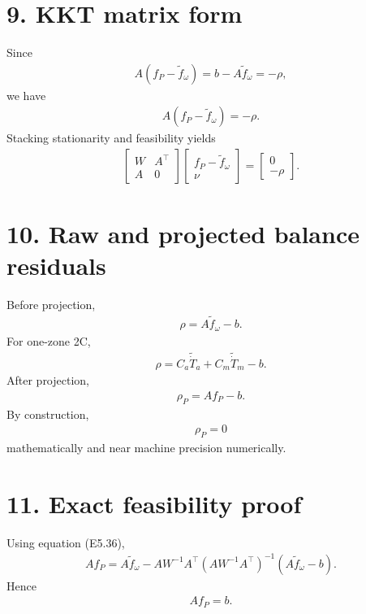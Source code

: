 \documentclass[11pt]{article}
\begin{document}
\section*{9. KKT matrix form}

Since
\begin{align}
A(f_P-\widetilde f_\omega)=b-A\widetilde f_\omega=-\rho,
\end{align}
we have
\begin{align}
\boxed{A(f_P-\widetilde f_\omega)=-\rho.}
\tag{E5.37}
\end{align}
Stacking stationarity and feasibility yields
\begin{align}
\boxed{\begin{bmatrix}W&A^\top\\A&0\end{bmatrix}\begin{bmatrix}f_P-\widetilde f_\omega\\\nu\end{bmatrix}=\begin{bmatrix}0\\-\rho\end{bmatrix}.}
\tag{E5.38}
\end{align}

\section*{10. Raw and projected balance residuals}

Before projection,
\begin{align}
\boxed{\rho=A\widetilde f_\omega-b.}
\tag{E5.39}
\end{align}
For one-zone 2C,
\begin{align}
\boxed{\rho=C_a\widetilde{\dot T}_a+C_m\widetilde{\dot T}_m-b.}
\tag{E5.40}
\end{align}
After projection,
\begin{align}
\boxed{\rho_P=Af_P-b.}
\tag{E5.41}
\end{align}
By construction,
\begin{align}
\boxed{\rho_P=0}
\tag{E5.42}
\end{align}
mathematically and near machine precision numerically.

\section*{11. Exact feasibility proof}

Using equation (E5.36),
\begin{align}
Af_P=A\widetilde f_\omega-AW^{-1}A^\top(AW^{-1}A^\top)^{-1}(A\widetilde f_\omega-b).
\end{align}
Hence
\begin{align}
\boxed{Af_P=b.}
\tag{E5.43}
\end{align}
\end{document}
